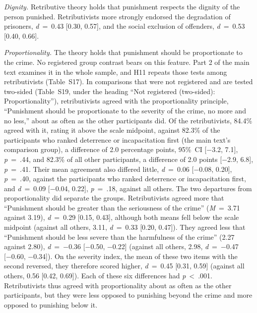 \emph{Dignity.} Retributive theory holds that punishment respects the dignity of the person punished. Retributivists more strongly endorsed the degradation of prisoners, \emph{d}~=~0.43 {[}0.30, 0.57{]}, and the social exclusion of offenders, \emph{d}~=~0.53 {[}0.40, 0.66{]}.

\emph{Proportionality.} The theory holds that punishment should be proportionate to the crime. No registered group contrast bears on this feature. Part 2 of the main text examines it in the whole sample, and H11 repeats those tests among retributivists (Table~S17). In comparisons that were not registered and are tested two-sided (Table~S19, under the heading ``Not registered (two-sided): Proportionality''), retributivists agreed with the proportionality principle, ``Punishment should be proportionate to the severity of the crime, no more and no less,'' about as often as the other participants did. Of the retributivists, 84.4\% agreed with it, rating it above the scale midpoint, against 82.3\% of the participants who ranked deterrence or incapacitation first (the main text's comparison group), a difference of 2.0 percentage points, 95\%~CI {[}−3.2, 7.1{]}, \emph{p}~=~.44, and 82.3\% of all other participants, a difference of 2.0 points {[}−2.9, 6.8{]}, \emph{p}~=~.41. Their mean agreement also differed little, \emph{d}~=~0.06 {[}−0.08, 0.20{]}, \emph{p}~=~.40, against the participants who ranked deterrence or incapacitation first, and \emph{d}~=~0.09 {[}−0.04, 0.22{]}, \emph{p}~=~.18, against all others. The two departures from proportionality did separate the groups. Retributivists agreed more that ``Punishment should be greater than the seriousness of the crime'' (\emph{M}~=~3.71 against 3.19), \emph{d}~=~0.29 {[}0.15, 0.43{]}, although both means fell below the scale midpoint (against all others, 3.11, \emph{d}~=~0.33 {[}0.20, 0.47{]}). They agreed less that ``Punishment should be less severe than the harmfulness of the crime'' (2.27 against 2.80), \emph{d}~=~−0.36 {[}−0.50, −0.22{]} (against all others, 2.98, \emph{d}~=~−0.47 {[}−0.60, −0.34{]}). On the severity index, the mean of these two items with the second reversed, they therefore scored higher, \emph{d}~=~0.45 {[}0.31, 0.59{]} (against all others, 0.56 {[}0.42, 0.69{]}). Each of these six differences had \emph{p}~\textless{}~.001. Retributivists thus agreed with proportionality about as often as the other participants, but they were less opposed to punishing beyond the crime and more opposed to punishing below it.

